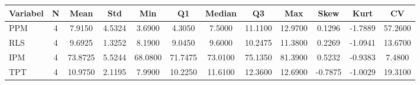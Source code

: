 \begin{adjustbox}{max width=\textwidth}
\small
\begin{tabular}{|p{2.5cm}|c|c|c|c|c|c|c|c|c|c|c|}
\hline
\textbf{Variabel} & \textbf{N} & \textbf{Mean} & \textbf{Std} & \textbf{Min} & \textbf{Q1} & \textbf{Median} & \textbf{Q3} & \textbf{Max} & \textbf{Skew} & \textbf{Kurt} & \textbf{CV} \\
\hline
PPM & 4 & 7.9150 & 4.5324 & 3.6900 & 4.3050 & 7.5000 & 11.1100 & 12.9700 & 0.1296 & -1.7889 & 57.2600 \\
RLS & 4 & 9.6925 & 1.3252 & 8.1900 & 9.0450 & 9.6000 & 10.2475 & 11.3800 & 0.2269 & -1.0941 & 13.6700 \\
IPM & 4 & 73.8725 & 5.5244 & 68.0800 & 71.7475 & 73.0100 & 75.1350 & 81.3900 & 0.5232 & -0.9383 & 7.4800 \\
TPT & 4 & 10.9750 & 2.1195 & 7.9900 & 10.2250 & 11.6100 & 12.3600 & 12.6900 & -0.7875 & -1.0029 & 19.3100 \\
\hline
\end{tabular}
\end{adjustbox}
